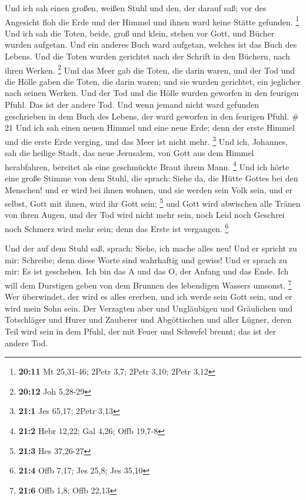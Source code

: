  Und ich sah einen großen, weißen Stuhl und den, der
darauf saß; vor des Angesicht floh die Erde und der Himmel und ihnen
ward keine Stätte gefunden. \footnote{\textbf{20:11} Mt 25,31-46; 2Petr
  3,7; 2Petr 3,10; 2Petr 3,12}  Und ich sah die Toten,
beide, groß und klein, stehen vor Gott, und Bücher wurden aufgetan. Und
ein anderes Buch ward aufgetan, welches ist das Buch des Lebens. Und die
Toten wurden gerichtet nach der Schrift in den Büchern, nach ihren
Werken. \footnote{\textbf{20:12} Joh 5,28-29}  Und das
Meer gab die Toten, die darin waren, und der Tod und die Hölle gaben die
Toten, die darin waren; und sie wurden gerichtet, ein jeglicher nach
seinen Werken.  Und der Tod und die Hölle wurden geworfen
in den feurigen Pfuhl. Das ist der andere Tod.  Und wenn
jemand nicht ward gefunden geschrieben in dem Buch des Lebens, der ward
geworfen in den feurigen Pfuhl. \# 21  Und ich sah einen
neuen Himmel und eine neue Erde; denn der erste Himmel und die erste
Erde verging, und das Meer ist nicht mehr. \footnote{\textbf{21:1} Jes
  65,17; 2Petr 3,13}  Und ich, Johannes, sah die heilige
Stadt, das neue Jerusalem, von Gott aus dem Himmel herabfahren, bereitet
als eine geschmückte Braut ihrem Mann. \footnote{\textbf{21:2} Hebr
  12,22; Gal 4,26; Offb 19,7-8}  Und ich hörte eine große
Stimme von dem Stuhl, die sprach: Siehe da, die Hütte Gottes bei den
Menschen! und er wird bei ihnen wohnen, und sie werden sein Volk sein,
und er selbst, Gott mit ihnen, wird ihr Gott sein; \footnote{\textbf{21:3}
  Hes 37,26-27}  und Gott wird abwischen alle Tränen von
ihren Augen, und der Tod wird nicht mehr sein, noch Leid noch Geschrei
noch Schmerz wird mehr sein; denn das Erste ist vergangen. \footnote{\textbf{21:4}
  Offb 7,17; Jes 25,8; Jes 35,10}

 Und der auf dem Stuhl saß, sprach: Siehe, ich mache alles
neu! Und er spricht zu mir: Schreibe; denn diese Worte sind wahrhaftig
und gewiss!  Und er sprach zu mir: Es ist geschehen. Ich
bin das A und das O, der Anfang und das Ende. Ich will dem Durstigen
geben von dem Brunnen des lebendigen Wassers umsonst. \footnote{\textbf{21:6}
  Offb 1,8; Offb 22,13}  Wer überwindet, der wird es alles
ererben, und ich werde sein Gott sein, und er wird mein Sohn sein.
 Der Verzagten aber und Ungläubigen und Gräulichen und
Totschläger und Hurer und Zauberer und Abgöttischen und aller Lügner,
deren Teil wird sein in dem Pfuhl, der mit Feuer und Schwefel brennt;
das ist der andere Tod.

